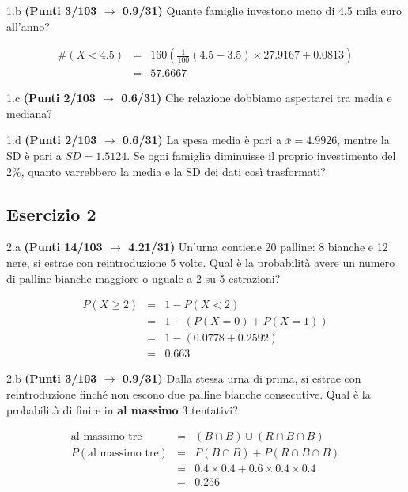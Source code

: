 \documentclass[
  11pt,
]{book}
\theoremstyle{mytheoremstyle}
\theoremstyle{mydefstyle}
\newenvironment{sol}
  {
  \begin{tcolorbox}[enhanced,breakable,arc=0.1mm,boxrule=1pt,colback=white,colframe=iblue,
  title=\bf \fontfamily{lmss}\selectfont \hspace{.5 cm} Soluzione,drop fuzzy shadow]

}{
\end{tcolorbox}
  }
\begin{document}
1.b \textbf{(Punti 3/103 \(\rightarrow\) 0.9/31)} Quante famiglie investono meno di 4.5 mila euro all'anno?

\begin{sol}
\begin{eqnarray*}
  \#(X<4.5) &=&  160(\frac1{100}(4.5-3.5)\times27.9167+0.0813)\\
  &=& 57.6667
\end{eqnarray*}

\end{sol}

1.c \textbf{(Punti 2/103 \(\rightarrow\) 0.6/31)} Che relazione dobbiamo aspettarci tra media e mediana?

1.d \textbf{(Punti 2/103 \(\rightarrow\) 0.6/31)} La spesa media è pari a \(\bar x=4.9926\), mentre la SD è pari a \(SD=1.5124\).
Se ogni famiglia diminuisse il proprio investimento del 2\%, quanto varrebbero la media e la SD dei dati così trasformati?

\subsection{Esercizio 2}\label{esercizio-2-22}

2.a \textbf{(Punti 14/103 \(\rightarrow\) 4.21/31)} Un'urna contiene 20 palline: 8 bianche e 12 nere, si estrae con reintroduzione 5 volte.
Qual è la probabilità avere un numero di palline bianche maggiore o uguale a 2 su 5 estrazioni?

\begin{sol}
\begin{eqnarray*}
  P(X\ge 2) &=&  1-P(X<2)\\
  &=& 1-(P(X=0)+P(X=1))\\
  &=& 1-(0.0778+0.2592)\\
  &=& 0.663
\end{eqnarray*}

\end{sol}

2.b \textbf{(Punti 3/103 \(\rightarrow\) 0.9/31)} Dalla stessa urna di prima, si estrae con reintroduzione finché non escono due palline bianche consecutive. Qual è la probabilità di finire in \textbf{al massimo} 3 tentativi?

\begin{sol}
\begin{eqnarray*}
  \text{al massimo tre} &=& (B\cap B)\cup(R\cap B\cap B )\\
  P(\text{al massimo tre}) &=& P(B\cap B)+P(R\cap B\cap B)\\
  &=&0.4\times 0.4 +0.6\times 0.4\times 0.4\\
  &=& 0.256
\end{eqnarray*}

\end{sol}
\end{document}
